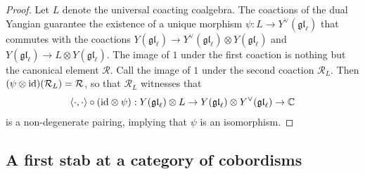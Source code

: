 \documentclass[11pt]{report}
\theoremstyle{definition}
\theoremstyle{remark}
\theoremstyle{remark}
\newcommand{\id}{\textnormal{id}}
\newcommand{\C}{\mathbb{C}}
\begin{document}
\begin{proof}
Let $L$ denote the universal coacting coalgebra. The coactions of the dual Yangian guarantee the existence of a unique morphism $\psi: L \to Y^\vee(\mathfrak{gl}_\ell)$ that commutes with the coactions $Y(\mathfrak{gl}_\ell) \to Y^\vee(\mathfrak{gl}_\ell) \otimes Y(\mathfrak{gl}_\ell)$ and $Y(\mathfrak{gl}_\ell) \to L \otimes Y(\mathfrak{gl}_\ell)$. The image of $1$ under the first coaction is nothing but the canonical element $\mathcal{R}$. Call the image of $1$ under the second coaction $\mathcal{R}_L$. Then $(\psi \otimes \id)(\mathcal{R}_L) = \mathcal{R}$, so that $\mathcal{R}_L$ witnesses that
\begin{equation*}
\langle \cdot,\cdot \rangle \circ (\id \otimes \psi): Y(\mathfrak{gl}_\ell) \otimes L \to Y(\mathfrak{gl}_\ell) \otimes Y^\vee(\mathfrak{gl}_\ell) \to \C
\end{equation*}
is a non-degenerate pairing, implying that $\psi$ is an isomorphism.
\end{proof}

\subsection{A first stab at a category of cobordisms}\label{subsection:naiveDef}
\end{document}
